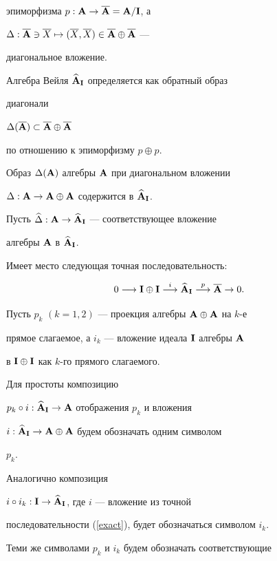 эпиморфизма $p:{\bold A}\to\overline{{\bold A}}={\bold A}/{\bold I}$, а


$\Delta:\overline\A\ni \overline{X}\mapsto


(\overline{X},\overline{X})\in\overline\A\oplus\overline\A$ ---


диагональное вложение.


Алгебра Вейля $\widehat{{\bold A}}_{{\bold I}}$ определяется как обратный образ


диагонали


$\Delta(\overline{{\bold A}})\subset\overline{{\bold A}}\oplus\overline{{\bold A}}$


по отношению к эпиморфизму $p\oplus p$.


Образ $\Delta({\bold A})$ алгебры ${\bold A}$ при диагональном вложении


$\Delta:{\bold A}\to{\bold A}\oplus{\bold A}$ содержится в $\widehat{{\bold A}}_{\bold I}$.


Пусть $\widehat\Delta:{\bold A}\to\widehat{{\bold A}}_{\bold I}$ --- соответствующее вложение


алгебры ${\bold A}$ в $\widehat{{\bold A}}_{\bold I}$.


Имеет место следующая точная последовательность:


\begin{equation}


\label{exact}


0\longrightarrow\I\oplus\I \overset{i}{\longrightarrow}{}


\widehat\A_\I \overset{p}{\longrightarrow}{}


\overline{\A} \to 0.


\end{equation}


Пусть $p_k$ $(k=1,2)$ --- проекция алгебры ${\bold A}\oplus{\bold A}$ на $k$-е


прямое слагаемое, а $i_k$ --- вложение идеала ${\bold I}$ алгебры ${\bold A}$


в ${\bold I}\oplus{\bold I}$ как $k$-го прямого слагаемого.


Для простоты композицию


$p_k\circ i:\widehat{{\bold A}}_{{\bold I}}\to{\bold A}$ отображения $p_k$ и вложения


$i:\widehat{{\bold A}}_{\bold I}\to{\bold A}\oplus{\bold A}$ будем обозначать одним символом


$p_k$.


Аналогично композиция


$i\circ i_k:{\bold I}\to\widehat{{\bold A}}_{{\bold I}}$, где $i$ --- вложение из точной


последовательности (\ref{exact}), будет обозначаться символом $i_k$.


Теми же символами $p_k$ и $i_k$ будем обозначать соответствующие


